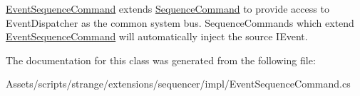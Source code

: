 \hyperlink{classstrange_1_1extensions_1_1sequencer_1_1impl_1_1_event_sequence_command}{Event\-Sequence\-Command} extends \hyperlink{classstrange_1_1extensions_1_1sequencer_1_1impl_1_1_sequence_command}{Sequence\-Command} to provide access to Event\-Dispatcher as the common system bus. Sequence\-Commands which extend \hyperlink{classstrange_1_1extensions_1_1sequencer_1_1impl_1_1_event_sequence_command}{Event\-Sequence\-Command} will automatically inject the source I\-Event. 

The documentation for this class was generated from the following file\-:\begin{DoxyCompactItemize}
\item 
Assets/scripts/strange/extensions/sequencer/impl/Event\-Sequence\-Command.\-cs\end{DoxyCompactItemize}

